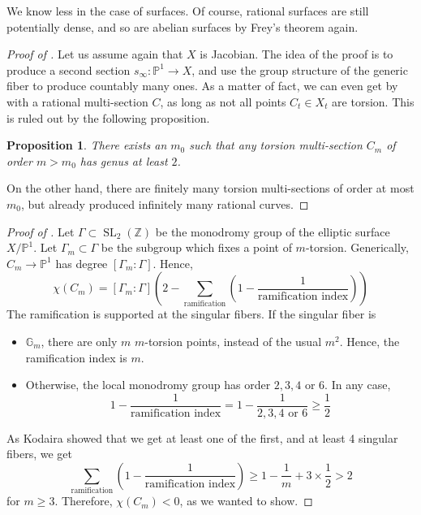 \documentclass{amsart}
\theoremstyle{plain}
\newtheorem{proposition}[theorem]{Proposition}
\theoremstyle{definition}
\theoremstyle{remark}
\DeclareMathOperator{\SL}{SL}
\begin{document}
We know less in the case of surfaces. Of course, rational surfaces are still potentially dense, and so
are abelian surfaces by Frey's theorem again. 

\begin{proof}[Proof of ]
Let us assume again that $X$ is Jacobian. The idea of the proof is to produce a second section 
$s_{\infty}: \mathbb{P}^1 \to X$, and use the group structure of the generic fiber to produce countably many ones. As a matter of fact, we can even get by with a rational multi-section $C$, as long as not all points 
$C_t \in X_t$ are torsion. This is ruled out by the following proposition.
\begin{proposition}
 \label{proposition:torsion}
 There exists an $m_0$ such that any torsion multi-section $C_m$ of order $m>m_0$ has genus at least $2$.
 \end{proposition}
 On the other hand, there are finitely many torsion multi-sections of order at most $m_0$, but
  already produced infinitely many rational curves.
\end{proof}

\begin{proof}[Proof of ]
Let $\Gamma \subset \SL_2(\mathbb{Z})$ be the monodromy group of the elliptic surface $X/\mathbb{P}^1$.
Let $\Gamma_m \subset \Gamma$ be the subgroup which fixes a point of $m$-torsion.
Generically, $C_m \to \mathbb{P}^1$ has degree $[\Gamma_m:\Gamma]$. Hence,
\[
	\chi(C_m)=[\Gamma_m:\Gamma]\left( 2- \sum_{\text{ramification}} (1- \frac{1}{\text{ramification index}})
	\right)
\]
The ramification is supported at the singular fibers. If the singular fiber is
\begin{itemize}
	\item $\mathbb{G}_m$, there are only $m$ $m$-torsion points, instead of the usual $m^2$. Hence,
	the ramification index is $m$.
	\item Otherwise, the local monodromy group has order $2,3,4$ or $6$. In any case, 
	\[
		1- \frac{1}{\text{ramification index}} = 1 - \frac{1}{\text{$2,3,4$ or $6$}} \geq \frac{1}{2}
	\]
\end{itemize}

As Kodaira showed that we get at least one of the first, and at least 4 singular fibers, we get
\[
	\sum_{\text{ramification}} (1- \frac{1}{\text{ramification index}}) \geq 1-\frac{1}{m} +3 \times \frac{1}{2}> 2
\]
for $m \geq 3$. Therefore, $\chi(C_m)<0$, as we wanted to show.
\end{proof}
\end{document}
